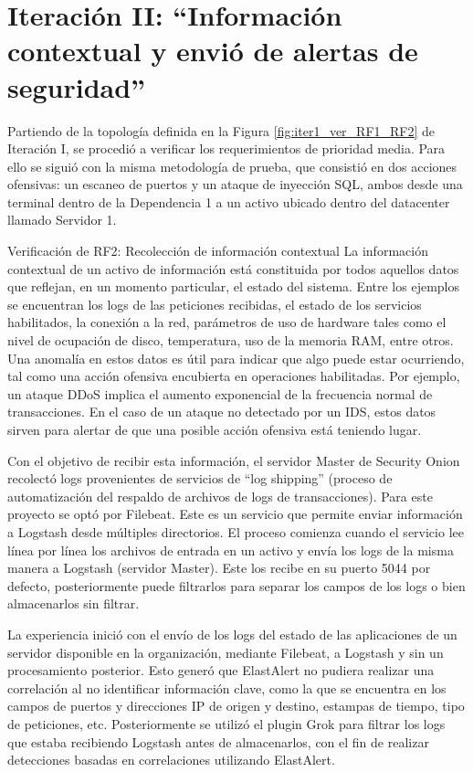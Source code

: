 \chapter{\Large Iteración II: “Información contextual y envió de alertas de seguridad”}
\label{iteracion2}
    Partiendo de la topología definida en la Figura \ref{fig:iter1_ver_RF1_RF2} de Iteración I, se procedió a verificar los requerimientos de prioridad media. Para ello se siguió con la misma metodología de prueba, que consistió en dos acciones ofensivas: un escaneo de puertos y un ataque de inyección SQL, ambos desde una terminal dentro de la Dependencia 1 a un activo ubicado dentro del datacenter llamado Servidor 1.
    \begin{section}{Verificación de RF2: Recolección de información contextual}
    La información contextual de un activo de información está constituida por todos aquellos datos que reflejan, en un momento particular, el estado del sistema. Entre los ejemplos se encuentran los logs de las peticiones recibidas, el estado de los servicios habilitados, la conexión a la red, parámetros de uso de hardware tales como el nivel de ocupación de disco, temperatura, uso de la memoria RAM, entre otros. Una anomalía en estos datos es útil para indicar que algo puede estar ocurriendo, tal como una acción ofensiva encubierta en operaciones habilitadas. Por ejemplo, un ataque DDoS implica el aumento exponencial de la frecuencia normal de transacciones. En el caso de un ataque no detectado por un IDS, estos datos sirven para alertar de que una posible acción ofensiva está teniendo lugar. \par
    Con el objetivo de recibir esta información, el servidor Master de Security Onion recolectó logs provenientes de servicios de “log shipping” (proceso de automatización del respaldo de archivos de logs de transacciones). Para este proyecto se optó por Filebeat. Este es un servicio que permite enviar información a Logstash desde múltiples directorios. El proceso comienza cuando el servicio lee línea por línea los archivos de entrada en un activo y envía los logs de la misma manera a Logstash (servidor Master). Este los recibe en su puerto 5044 por defecto, posteriormente puede filtrarlos para separar los campos de los logs o bien almacenarlos sin filtrar. \par
    La experiencia inició con el envío de los logs del estado de las aplicaciones de un servidor disponible en la organización, mediante Filebeat, a Logstash y sin un procesamiento posterior. Esto generó que ElastAlert no pudiera realizar una correlación al no identificar información clave, como la que se encuentra en los campos de puertos y direcciones IP de origen y destino, estampas de tiempo, tipo de peticiones, etc. Posteriormente se utilizó el plugin Grok \cite{grok} para filtrar los logs que estaba recibiendo Logstash antes de almacenarlos, con el fin de realizar detecciones basadas en correlaciones utilizando ElastAlert.\par

\end{section}
